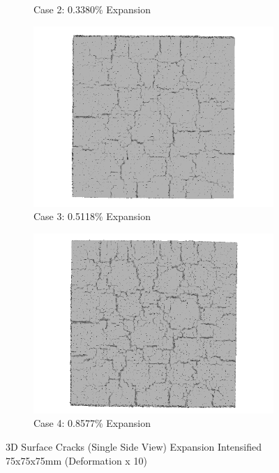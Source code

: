\begin{figure}[!h]
\begin{subfigure}{.5\textwidth}
    \caption{Case 2: 0.3380\% Expansion}
    \end{subfigure}%
    \begin{subfigure}{.5\textwidth}
      \centering
      \includegraphics[width=.8\linewidth]{Files/exp_3D/DEF/A30X-5C_3_3ds.png}
    \caption{Case 3: 0.5118\% Expansion}
    \end{subfigure}
    \begin{subfigure}{.5\textwidth}
      \centering
      \includegraphics[width=.8\linewidth]{Files/exp_3D/DEF/A30X-5C_4_3ds.png}
    \caption{Case 4: 0.8577\% Expansion}
    \end{subfigure}%

  \caption{3D Surface Cracks (Single Side View) Expansion Intensified 75x75x75mm (Deformation x 10)}
  \label{fig:ASR_A30X-5C_3DS}
\end{figure}

